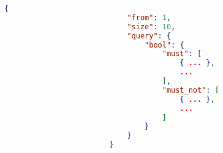 \begin{center}
    \begin{lstlisting}[label={lst:regular-query},language=json,caption={Structure of a normal Elasticsearch query},captionpos=b]
                        {
                            "from": 1,
                            "size": 10,
                            "query": {
                                "bool": {
                                    "must": [
                                        { ... },
                                        ...
                                    ],
                                    "must_not": [
                                        { ... },
                                        ...
                                    ]
                                }
                            }
                        }
    \end{lstlisting}
\end{center}

